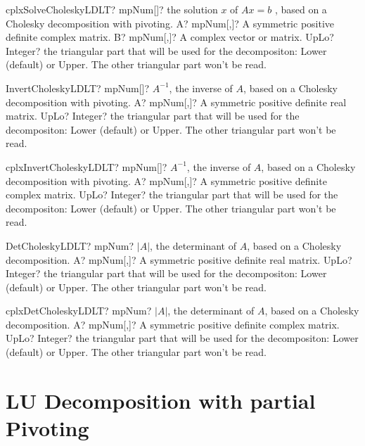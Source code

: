 \documentclass[12pt,a4paper,openany]{book}
\begin{document}
\begin{mpFunctionsExtract}
\mpFunctionThree
{cplxSolveCholeskyLDLT? mpNum[]? the solution $x$ of $A x = b$ , based on a Cholesky decomposition with pivoting.}
{A? mpNum[,]? A symmetric positive definite complex matrix.}
{B? mpNum[,]? A complex vector or matrix.}
{UpLo? Integer? the triangular part that will be used for the decompositon: Lower (default) or Upper. The other triangular part won't be read.}
\end{mpFunctionsExtract}

\begin{mpFunctionsExtract}
\mpFunctionTwo
{InvertCholeskyLDLT? mpNum[]? $A^{-1}$, the inverse of $A$, based on a Cholesky decomposition with pivoting.}
{A? mpNum[,]? A symmetric positive definite real matrix.}
{UpLo? Integer? the triangular part that will be used for the decompositon: Lower (default) or Upper. The other triangular part won't be read.}
\end{mpFunctionsExtract}

\begin{mpFunctionsExtract}
\mpFunctionTwo
{cplxInvertCholeskyLDLT? mpNum[]? $A^{-1}$, the inverse of $A$, based on a Cholesky decomposition with pivoting.}
{A? mpNum[,]? A symmetric positive definite complex matrix.}
{UpLo? Integer? the triangular part that will be used for the decompositon: Lower (default) or Upper. The other triangular part won't be read.}
\end{mpFunctionsExtract}

\begin{mpFunctionsExtract}
\mpFunctionTwo
{DetCholeskyLDLT? mpNum? $|A|$, the determinant of $A$, based on a Cholesky decomposition.}
{A? mpNum[,]? A symmetric positive definite real matrix.}
{UpLo? Integer? the triangular part that will be used for the decompositon: Lower (default) or Upper. The other triangular part won't be read.}
\end{mpFunctionsExtract}

\begin{mpFunctionsExtract}
\mpFunctionTwo
{cplxDetCholeskyLDLT? mpNum? $|A|$, the determinant of $A$, based on a Cholesky decomposition.}
{A? mpNum[,]? A symmetric positive definite complex matrix.}
{UpLo? Integer? the triangular part that will be used for the decompositon: Lower (default) or Upper. The other triangular part won't be read.}
\end{mpFunctionsExtract}

\section{LU Decomposition with partial Pivoting}
\end{document}
